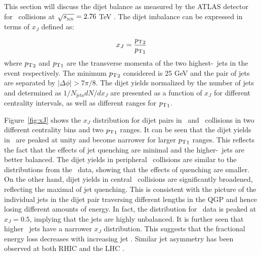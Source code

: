 
This section will discuss the dijet balance as measured by the ATLAS detector for \pbpb\ collisions at $\mbox{$\sqrt{s_{_\text{NN}}}$} = 2.76$ TeV \cite{Aaboud:2017eww}.
The dijet imbalance can be expressed in terms of $x_J$ defined as:

\begin{align}
x_J =  \frac{\mbox{$p_{\mathrm{T}}$}_2}{\mbox{$p_{\mathrm{T}}$}_1}
\end{align}
where $\mbox{$p_{\mathrm{T}}$}_2$ and $\mbox{$p_{\mathrm{T}}$}_1$ are the transverse momenta of the two highest-\pt\ jets in the event respectively.
The minimum $\mbox{$p_{\mathrm{T}}$}_2$ considered is 25 GeV and the pair of jets are separated by $|\Delta\phi| > 7\pi/8$.
The dijet yields normalized by the number of jets and determined as $1/N_\mathrm{jets} dN/dx_J$ are presented as a function of $x_J$ for different centrality intervals, as well as different ranges for $\mbox{$p_{\mathrm{T}}$}_1$.

Figure~\ref{fig:xJ} shows the $x_J$ distribution for dijet pairs in \pp\ and \pbpb\ collisions in two different centrality bins and two $\mbox{$p_{\mathrm{T}}$}_1$ ranges.
It can be seen that the dijet yields in \pp\ are peaked at unity and become narrower for larger $\mbox{$p_{\mathrm{T}}$}_1$ ranges.
This reflects the fact that the effects of jet quenching are minimal and the higher-\pt\ jets are better balanced.
The dijet yields in peripheral \pbpb\ collisions are similar to the distributions from the \pp\ data, showing that the effects of quenching are smaller.
On the other hand, dijet yields in central \pbpb\ collisions are significantly broadened, reflecting the maximal  of jet quenching.
This is consistent with the picture of the individual jets in the dijet pair traversing different lengths in the QGP and hence losing different amounts of energy.
In fact, the distribution for \pbpb\ data is peaked at $x_J = 0.5$, implying that the jets are highly unbalanced.
It is further seen that higher \pt\ jets have a narrower $x_J$ distribution.
This suggests that the fractional energy loss decreases with increasing jet \pt. 
Similar jet asymmetry has been observed at both RHIC and the LHC \cite{PhysRevLett.119.062301, Aad:2010bu, Chatrchyan:2012gt, Chatrchyan:2011sx}.

